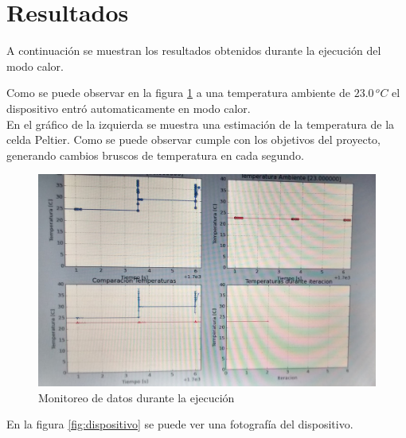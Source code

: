 \documentclass[10pt,spanish,a4paper,openany,notitlepage]{article}
\begin{document}
\section{Resultados}

A continuación se muestran los resultados obtenidos durante la ejecución
del modo calor. 

Como se puede observar en la figura \ref{fig:monitoreo} a una temperatura
ambiente de $23.0\, \unit{^oC}$ el dispositivo entró automaticamente en
modo calor. \\
En el gráfico de la izquierda se muestra una estimación de la temperatura
de la celda Peltier. Como se puede observar cumple con los objetivos del
proyecto, generando cambios bruscos de temperatura en cada segundo.

\begin{figure}[H] %
\begin{center}
\includegraphics[scale=0.30]{imagenes/monitoreo_datos.png}
\caption{Monitoreo de datos durante la ejecución}
 \label{fig:monitoreo}
\end{center}
\end{figure}

En la figura \ref{fig:dispositivo} se puede ver una fotografía del dispositivo.
\end{document}
